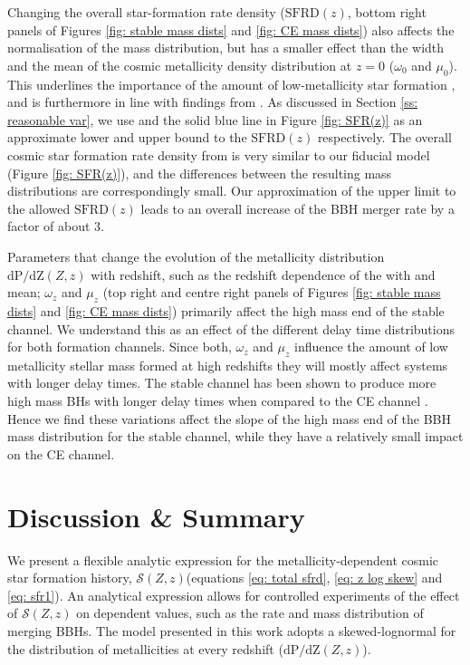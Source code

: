 \documentclass[linenumbers,twocolumn]{aastex631}
\newcommand{\SFRDzZ}{\ensuremath{\mathcal{S}(Z,z)}\xspace}
\newcommand{\SFRDz}{\ensuremath{\mathrm{SFRD}(z)}\xspace}
\newcommand{\dpdZ}{\ensuremath{\mathrm{dP/dZ}(Z,z)}\xspace}
\begin{document}
Changing the overall star-formation rate density (\SFRDz, bottom right panels of Figures \ref{fig: stable mass dists} and \ref{fig: CE mass dists}) also affects the normalisation of the mass distribution, but has a smaller effect than the width and the mean of the cosmic metallicity density distribution at $z=0$ ($\omega_0$ and $\mu_0$). This underlines the importance of the amount of low-metallicity star formation \citep[e.g.,][]{chruslinska2022_review}, and is furthermore in line with findings from \cite{Tang+2020}.
As discussed in Section \ref{ss: reasonable var}, we use \cite{Madau+2017} and the solid blue line in Figure \ref{fig: SFR(z)} as an approximate lower and upper bound to the \SFRDz respectively. 
The overall cosmic star formation rate density from \cite{Madau+2017} is very similar to our fiducial model (Figure \ref{fig: SFR(z)}), and the differences between the resulting mass distributions are correspondingly small. Our approximation of the upper limit to the allowed \SFRDz leads to an overall increase of the BBH merger rate by a factor of about 3. 


Parameters that change the evolution of the metallicity distribution \dpdZ with redshift, such as the redshift dependence of the with and mean; $\omega_z$ and $\mu_z$ (top right and centre right panels of Figures \ref{fig: stable mass dists} and \ref{fig: CE mass dists}) primarily affect the high mass end of the stable channel. 
We understand this as an effect of the different delay time distributions for both formation channels. Since both, $\omega_z$ and $\mu_z$ influence the amount of low metallicity stellar mass formed at high redshifts they will mostly affect systems with longer delay times. The stable channel has been shown to produce more high mass BHs with longer delay times when compared to the CE channel \citep{vanson+2022, Briel+2022}. 
Hence we find these variations affect the slope of the high mass end of the BBH mass distribution for the stable channel, while they have a relatively small impact on the CE channel.



\section{Discussion \& Summary \label{sec: summary}}
We present a flexible analytic expression for the metallicity-dependent cosmic star formation history, \SFRDzZ (equations \ref{eq: total sfrd}, \ref{eq: z log skew} and \ref{eq: sfr1}). An analytical expression allows for controlled experiments of the effect of \SFRDzZ on dependent values, such as the rate and mass distribution of merging BBHs. The model presented in this work adopts a skewed-lognormal for the distribution of metallicities at every redshift (\dpdZ). 
\end{document}
